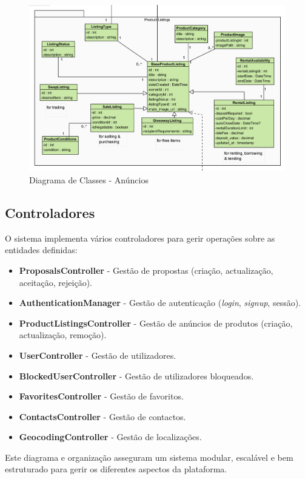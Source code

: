 \documentclass[a4paper, 12pt]{article} %
\begin{document}
\begin{figure}[ht]
	\centering
	\includegraphics[width=\textwidth]{../images/class-diagram-listings.png}
	\caption{Diagrama de Classes - Anúncios}
	\label{fig:class_diagram_listings}
\end{figure}

\newpage
\subsection{Controladores}
O sistema implementa vários controladores para gerir operações sobre as entidades definidas:
\begin{itemize}
	\item \textbf{ProposalsController} - Gestão de propostas (criação, actualização, aceitação, rejeição).
	\item \textbf{AuthenticationManager} - Gestão de autenticação (\textit{login}, \textit{signup}, sessão).
	\item \textbf{ProductListingsController} - Gestão de anúncios de produtos (criação, actualização, remoção).
	\item \textbf{UserController} - Gestão de utilizadores.
	\item \textbf{BlockedUserController} - Gestão de utilizadores bloqueados.
	\item \textbf{FavoritesController} - Gestão de favoritos.
	\item \textbf{ContactsController} - Gestão de contactos.
	\item \textbf{GeocodingController} - Gestão de localizações.
\end{itemize}

Este diagrama e organização asseguram um sistema modular, escalável e bem estruturado para gerir os diferentes aspectos da plataforma.
\end{document}
